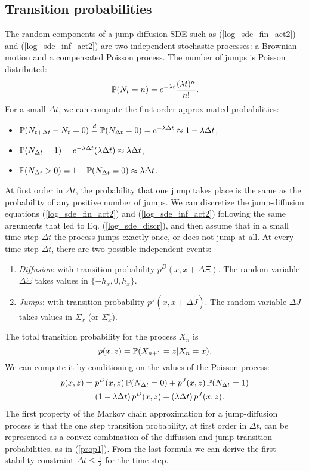\subsection{Transition probabilities}\label{B1}
The random components of a jump-diffusion SDE such as (\ref{log_sde_fin_act2}) and (\ref{log_sde_inf_act2}) are two independent stochastic processes:
a Brownian motion and a compensated Poisson process.
The number of jumps is Poisson distributed:
\begin{equation}
 \mathbb{P}(N_t = n) = e^{-\lambda t} \frac{ (\lambda t)^n }{n!}.
\end{equation}
For a small $\Delta t$, we can compute the first order approximated probabilities:
\begin{itemize}
 \item $\mathbb{P}( N_{t+\Delta t} - N_t = 0) \overset{d}{=} \mathbb{P}( N_{\Delta t} = 0) = e^{-\lambda \Delta t } \approx 1-\lambda \Delta t $,
 \item $\mathbb{P}( N_{\Delta t} = 1) = e^{-\lambda \Delta t } (\lambda \Delta t) \approx \lambda \Delta t $,
 \item $\mathbb{P}( N_{\Delta t} > 0) = 1-\mathbb{P}( N_{\Delta t} = 0) \approx \lambda \Delta t $.
\end{itemize}
At first order in $\Delta t$, the probability that one jump takes place is the same as the probability of any positive number of jumps.
We can discretize the jump-diffusion equations (\ref{log_sde_fin_act2}) and (\ref{log_sde_inf_act2}) following the same arguments that led to Eq. (\ref{log_sde_discr}), and then assume that in a small time step $\Delta t$ the process jumps exactly once,
or does not jump at all.
At every time step $\Delta t$, there are two possible independent events:
\begin{enumerate}
 \item \emph{Diffusion}: 
 with transition probability $p^D(x, x + \Delta \Xi)$. The random variable $\Delta \Xi$ takes values in $\{ -h_x,0,h_x \}$.
 \item \emph{Jumps}: 
 with transition probability $p^J(x, x + \Delta \tilde J)$. The random variable $\Delta \tilde J$ takes values 
 in $\Sigma_x$ (or $\Sigma^{\epsilon}_x$).
\end{enumerate}
The total transition probability for the process $X_n$ is $$p(x,z) = \mathbb{P}(X_{n+1} = z | X_n = x). $$ 
We can compute it by conditioning on the values of the Poisson process:  
\begin{align}\label{prop1}
 p(x,z) &= p^D(x,z) \, \mathbb{P}( N_{\Delta t} = 0) + p^J(x,z) \, \mathbb{P}( N_{\Delta t} = 1) \\ \nonumber
	&= (1-\lambda \Delta t) \, p^D(x,z) + (\lambda \Delta t ) \, p^J(x,z).
\end{align}
The first property of the Markov chain approximation for a jump-diffusion process 
is that the one step transition probability, at first order in $\Delta t$, can be represented as a convex combination of the diffusion and jump transition probabilities, 
as in (\ref{prop1}). From the last formula we can derive the first stability constraint $\Delta t \leq \frac{1}{\lambda}$ for the time step.



